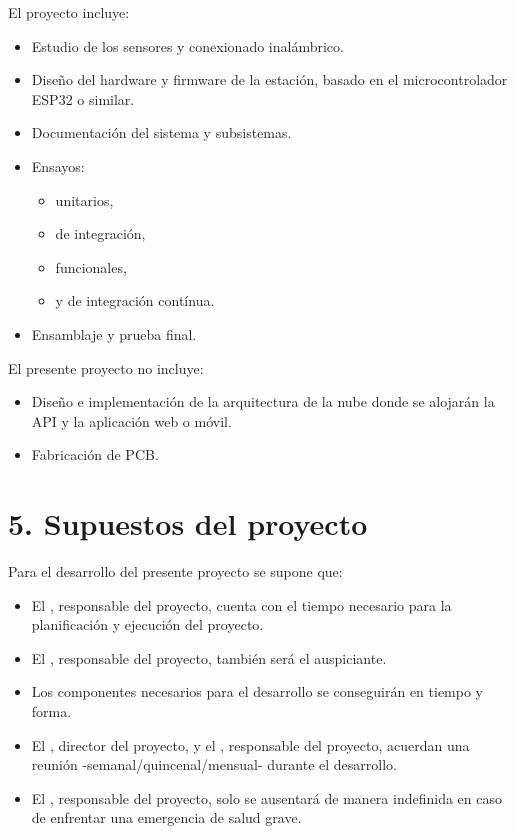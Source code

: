 \documentclass[
11pt, %
codirector, %
]{charter}
\begin{document}
El proyecto incluye:
\begin{itemize}
	\item Estudio de los sensores y conexionado inalámbrico.
	\item Diseño del hardware y firmware de la estación, basado en el microcontrolador ESP32 o similar.
	\item Documentación del sistema y subsistemas.
	\item Ensayos:
	\begin{itemize}
		\item unitarios,
		\item de integración,
		\item funcionales,
		\item y de integración contínua.
		\end{itemize}
	\item Ensamblaje y prueba final.
	
\end{itemize}

El presente proyecto no incluye:

\begin{itemize}
	\item Diseño e implementación de la arquitectura de la nube donde se alojarán la API y la aplicación web o móvil.
	\item Fabricación de PCB.
	
\end{itemize}

\section{5. Supuestos del proyecto}
\label{sec:supuestos}

Para el desarrollo del presente proyecto se supone que:

\begin{itemize}
	\item El \authorname, responsable del proyecto, cuenta con el tiempo necesario para
la planificación y ejecución del proyecto.
	\item El \authorname, responsable del proyecto, también será el auspiciante.
	\item Los componentes necesarios para el desarrollo se conseguirán en tiempo y forma.
	\item El \supname, director del proyecto, y el \authorname, responsable del
proyecto, acuerdan una reunión -semanal/quincenal/mensual- durante el desarrollo.
	\item El \authorname, responsable del proyecto, solo se ausentará de manera indefinida en caso de enfrentar una emergencia de salud grave.
\end{itemize}
\end{document}
